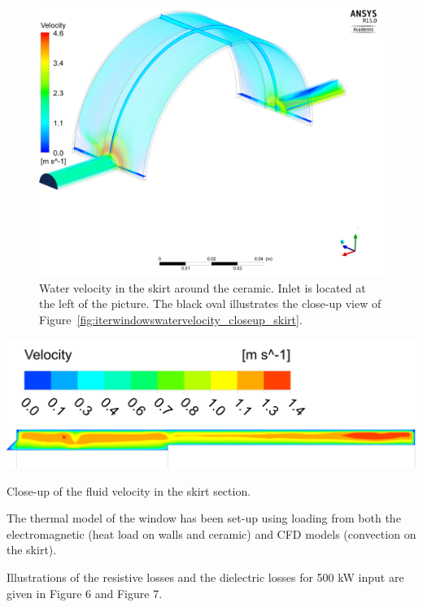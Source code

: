 \begin{figure}
	\centering
	\includegraphics[width=1.0\linewidth]{figures/chap3/ITER_window/ITER_windows_water_velocity}
	\caption{Water velocity in the skirt around the ceramic. Inlet is located at the left of the picture. The black oval illustrates the close-up view of Figure~\ref{fig:iterwindowswatervelocity_closeup_skirt}.}
	\label{fig:iterwindowswatervelocity}
\end{figure}

\begin{marginfigure}[-5cm]
	\centering
	\includegraphics[width=1.0\linewidth]{figures/chap3/ITER_window/ITER_windows_water_velocity_closeup_skirt}
	\caption{Close-up of the fluid velocity in the skirt section.}
	\label{fig:iterwindowswatervelocity_closeup_skirt}
\end{marginfigure}

The thermal model of the window has been set-up using loading from both the electromagnetic (heat load on walls and ceramic) and CFD models (convection on the skirt). 

Illustrations of the resistive losses and the dielectric losses for 500 kW input are given in Figure 6 and Figure 7.

